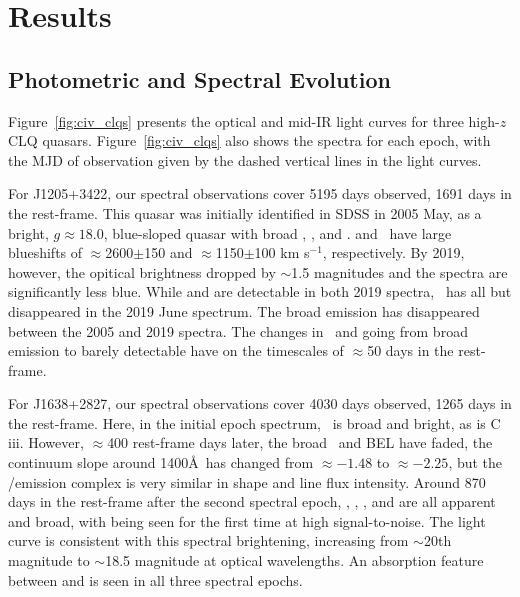\documentclass[a4paper,fleqn,usenatbib]{mnras}
\begin{document}
\section{Results}
\subsection{Photometric and Spectral Evolution}
Figure~\ref{fig:civ_clqs} presents the optical and mid-IR light
curves for three high-$z$ CLQ quasars.  Figure~\ref{fig:civ_clqs} also
shows the spectra for each epoch, with the MJD of observation given by
the dashed vertical lines in the light curves.

For J1205+3422, our spectral observations cover 5195 days observed,
1691 days in the rest-frame. This quasar was initially identified in
SDSS in 2005 May, as a bright, $g\approx18.0$, blue-sloped quasar with
broad \siiv, \civ, \ciii and \mgii. \ciii and \civ\ have large
blueshifts of $\approx$2600$\pm$150 and $\approx$1150$\pm$100 km
s$^{-1}$, respectively.  By 2019, however, the opitical brightness
dropped by $\sim$1.5 magnitudes and the spectra are significantly less
blue.  While \lya and \nv are detectable in both 2019 spectra, \civ\
has all but disappeared in the 2019 June spectrum.  The broad \ciii
emission has disappeared between the 2005 and 2019 spectra. The
changes in \civ\ and \ciii going from broad emission to barely
detectable have on the timescales of $\approx$50 days in the
rest-frame.

For J1638+2827, our spectral observations cover 4030 days observed,
1265 days in the rest-frame. Here, in the initial epoch spectrum,
\civ\ is broad and bright, as is C\,{\sc iii}. However, $\approx$400
rest-frame days later, the broad \civ\ and \ciii BEL have faded, the
continuum slope around 1400\AA\ has changed from $\approx-1.48$ to
$\approx-2.25$, but the \lya/\nv emission complex is very similar in
shape and line flux intensity. Around 870 days in the rest-frame after
the second spectral epoch, \lya, \nv, \civ, \ciii and \mgii are all
apparent and broad, with \mgii being seen for the first time at high
signal-to-noise. The light curve is consistent with this spectral
brightening, increasing from $\sim$20th magnitude to $\sim$18.5
magnitude at optical wavelengths. An absorption feature between \lya
and \nv is seen in all three spectral epochs.
\end{document}
